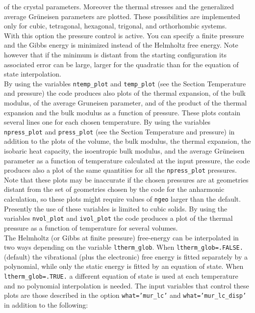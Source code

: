 \documentclass[12pt,a4paper,twoside]{report}
\begin{document}
of the crystal parameters.
Moreover the thermal stresses and the generalized average Gr\"uneisen
parameters are plotted.
These possibilities are implemented only for cubic, tetragonal, 
hexagonal, trigonal, and orthorhombic systems. \\
With this option the pressure control is active. You can specify a
finite pressure and the Gibbs energy is minimized instead of the
Helmholtz free energy. Note however that if the minimum is distant from 
the starting configuration its associated error can be large, larger for the
quadratic than for the equation of state interpolation. \\
By using the variables \texttt{ntemp\_plot} and \texttt{temp\_plot} (see
the Section Temperature and pressure) the code produces also plots
of the thermal expansion, of the bulk modulus, of the average 
Gruneisen parameter, and of the product of the thermal expansion
and the bulk modulus as a function of pressure. These plots contain
several lines one for each chosen temperature.
By using the variables \texttt{npress\_plot} and \texttt{press\_plot} (see
the Section Temperature and pressure) in addition to the plots of
the volume, the bulk modulus, the thermal expansion, the 
isobaric heat capacity, 
the isoentropic bulk modulus, and the average Gr\"uneisen parameter 
as a function of temperature calculated at the input pressure, the code
produces also a plot of the same quantities for all the \texttt{npress\_plot}
pressures. Note that these plots may be inaccurate if the chosen
pressures are at geometries distant from the set of geometries chosen
by the code for the anharmonic calculation, so these plots might
require values of \texttt{ngeo} larger than the default. Presently the
use of these variables is limited to cubic solids.
By using the variables \texttt{nvol\_plot} and \texttt{ivol\_plot} the
code produces a plot of the thermal pressure as a function of temperature
for several volumes. \\
The Helmholtz (or Gibbs at finite pressure) free-energy can be interpolated
in two ways depending on the variable \texttt{ltherm\_glob}. 
When \texttt{ltherm\_glob=.FALSE.} (default) the vibrational (plus 
the electronic) free energy is fitted separately by a polynomial, while
only the static energy is fitted by an equation of state. When
 \texttt{ltherm\_glob=.TRUE.} a different equation of state is used 
at each temperature and no polynomial interpolation is needed.
The input variables that control these plots are those described in the option
\texttt{what='mur\_lc'} and \texttt{what='mur\_lc\_disp'} in addition to the 
following:
\end{document}
